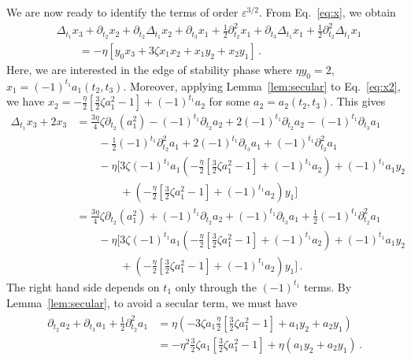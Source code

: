 \documentclass[11pt,english,reqno]{article}
\theoremstyle{plain}
\theoremstyle{definition}
\theoremstyle{remark}
\numberwithin{equation}{section}
\begin{document}
We are now ready to identify the terms of order $\varepsilon^{3/2}$. From Eq.~\eqref{eq:x}, we obtain
\begin{align*}
    &\Delta_{t_1} x_3 + \partial_{t_2} x_2 + \partial_{t_2} \Delta_{t_1} x_2 + \partial_{t_3} x_1 + \frac{1}{2} \partial_{t_2}^2 x_1 + \partial_{t_3} \Delta_{t_1}x_1 + \frac{1}{2} \partial_{t_2}^2 \Delta_{t_1}x_1 \\
    &\qquad= - \eta \left[y_0 x_3 + 3 \zeta x_1 x_2 + x_1 y_2 + x_2 y_1\right] \, .
\end{align*}
Here, we are interested in the edge of stability phase where $\eta y_0 = 2$, $x_1 = (-1)^{t_1}a_1(t_2, t_3)$. Moreover, applying Lemma~\ref{lem:secular} to Eq.~\eqref{eq:x2}, we have $x_2 = -\frac{\eta}{2} \left[\frac{3}{2}\zeta a_1^2-1\right]+(-1)^{t_1}a_2$ for some $a_2 = a_2(t_2, t_3)$. This gives
\begin{align*}
    \Delta_{t_1} x_3 + 2x_3 &= \frac{3\eta}{4} \zeta \partial_{t_2} \left(a_1^2\right) - (-1)^{t_1} \partial_{t_2} a_2 + 2(-1)^{t_1} \partial_{t_2} a_2  - (-1)^{t_1} \partial_{t_3} a_1 \\
    &\qquad- \frac{1}{2} (-1)^{t_1} \partial_{t_2}^2 a_1 + 2 (-1)^{t_1} \partial_{t_3} a_1 + (-1)^{t_1} \partial_{t_2}^2 a_1 \\
    &\qquad- \eta \bigg[3\zeta (-1)^{t_1} a_1 \left(-\frac{\eta}{2} \left[\frac{3}{2}\zeta a_1^2 - 1\right] + (-1)^{t_1}a_2\right) + (-1)^{t_1} a_1 y_2 \\
    &\qquad\qquad + \left(-\frac{\eta}{2} \left[\frac{3}{2}\zeta a_1^2 - 1\right] + (-1)^{t_1}a_2\right)y_1\bigg] \\
    &= \frac{3\eta}{4} \zeta \partial_{t_2} \left(a_1^2\right) + (-1)^{t_1} \partial_{t_2} a_2  + (-1)^{t_1} \partial_{t_3} a_1 + \frac{1}{2} (-1)^{t_1} \partial_{t_2}^2 a_1  \\
    &\qquad- \eta \bigg[3\zeta (-1)^{t_1} a_1 \left(-\frac{\eta}{2} \left[\frac{3}{2}\zeta a_1^2 - 1\right] + (-1)^{t_1}a_2\right) + (-1)^{t_1} a_1 y_2 \\
    &\qquad\qquad + \left(-\frac{\eta}{2} \left[\frac{3}{2}\zeta a_1^2 - 1\right] + (-1)^{t_1}a_2\right)y_1\bigg] \, . 
\end{align*}
The right hand side depends on $t_1$ only through the $(-1)^{t_1}$ terms. By Lemma~\ref{lem:secular}, to avoid a secular term, we must have
\begin{align}
    \label{eq:aux-a}
    \begin{split}
    \partial_{t_2} a_2 + \partial_{t_3} a_1 + \frac{1}{2} \partial_{t_2}^2 a_1 &= \eta \left(-3\zeta a_1 \frac{\eta}{2} \left[\frac{3}{2}\zeta a_1^2 - 1\right] + a_1 y_2 + a_2 y_1 \right) \\
    &= -\eta^2 \frac{3}{2} \zeta a_1 \left[\frac{3}{2}\zeta a_1^2 - 1\right] + \eta \left(a_1 y_2 + a_2 y_1 \right) \, .
    \end{split}
\end{align}
\end{document}
